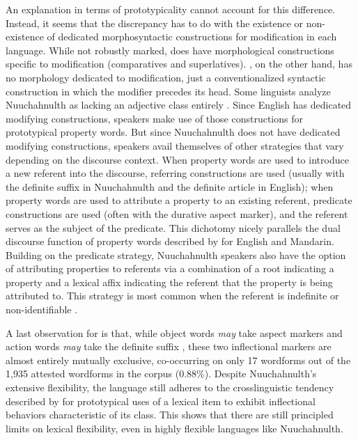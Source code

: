 An explanation in terms of prototypicality cannot account for this difference. Instead, it seems that the discrepancy has to do with the existence or non-existence of dedicated morphosyntactic constructions for modification in each language. While not robustly marked,  does have morphological constructions specific to modification (comparatives and superlatives). , on the other hand, has no morphology dedicated to modification, just a conventionalized syntactic construction in which the modifier precedes its head. Some linguists analyze Nuuchahnulth as lacking an adjective class entirely \parencite{Nakayama2001}. Since English has dedicated modifying constructions, speakers make use of those constructions for prototypical property words. But since Nuuchahnulth does not have dedicated modifying constructions, speakers avail themselves of other strategies that vary depending on the discourse context. When property words are used to introduce a new referent into the discourse, referring constructions are used (usually with the definite suffix  in Nuuchahnulth and the definite article in English); when property words are used to attribute a property to an existing referent, predicate constructions are used (often with the durative aspect marker), and the referent serves as the subject of the predicate. This dichotomy nicely parallels the dual discourse function of property words described by \textcite{Thompson1989} for English and Mandarin. Building on the predicate strategy, Nuuchahnulth speakers also have the option of attributing properties to referents via a combination of a root indicating a property and a lexical affix indicating the referent that the property is being attributed to. This strategy is most common when the referent is indefinite or non-identifiable \parencite[144]{Nakayama2001}.

A last observation for  is that, while object words \emph{may} take aspect markers and action words \emph{may} take the definite suffix , these two inflectional markers are almost entirely mutually exclusive, co-occurring on only 17 wordforms out of the 1,935 attested wordforms in the corpus (0.88\%). Despite Nuuchahnulth's extensive flexibility, the language still adheres to the crosslinguistic tendency described by \textcite{HopperThompson1984} for prototypical uses of a lexical item to exhibit inflectional behaviors characteristic of its class. This shows that there are still principled limits on lexical flexibility, even in highly flexible languages like Nuuchahnulth.

